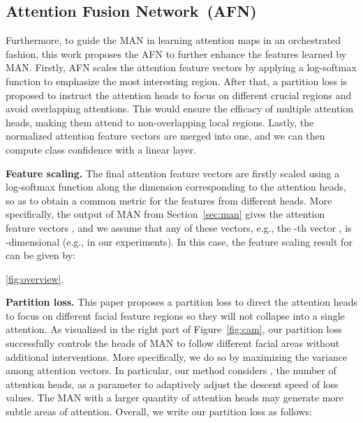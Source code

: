 \documentclass{article}
\begin{document}
\subsection{Attention Fusion Network~(AFN)}
Furthermore, to guide the MAN in learning attention maps in an orchestrated fashion, this work proposes the AFN to further enhance the features learned by MAN.
Firstly, AFN scales the {attention feature vectors} by applying a log-softmax function to emphasize the most interesting region. After that, a partition loss is proposed to instruct the attention heads to focus on different crucial regions and avoid overlapping attentions. This would ensure the efficacy of multiple attention heads, making them attend to non-overlapping local regions. Lastly, the normalized {attention feature vectors} are merged into one, and we can then compute class confidence with a linear layer. 



\noindent\textbf{{Feature scaling.}} {The final attention feature vectors  are firstly scaled using a log-softmax function along the dimension corresponding to the attention heads, so as to obtain a common metric for the features from different heads. More specifically, the output of MAN from Section}~\ref{sec:man} {gives the attention feature vectors , and we assume that any of these vectors, e.g., the -th vector , is -dimensional (e.g.,  in our experiments). In this case, the feature scaling result  for  can be given by:}


\ref{fig:overview}.

\noindent\textbf{{Partition loss.}} This paper proposes a partition loss to direct the attention heads to focus on different facial feature regions so they will not collapse into a single attention. As visualized in the right part of Figure~\ref{fig:cam}, our partition loss successfully controls the heads of MAN to follow different facial areas without additional interventions. 
More specifically, we do so by maximizing the variance among attention vectors. In particular, our method considers , the number of attention heads, as a parameter to adaptively adjust the descent speed of loss values. The MAN with a larger quantity of attention heads may generate more subtle areas of attention. Overall, we write our partition loss as follows:
\end{document}
